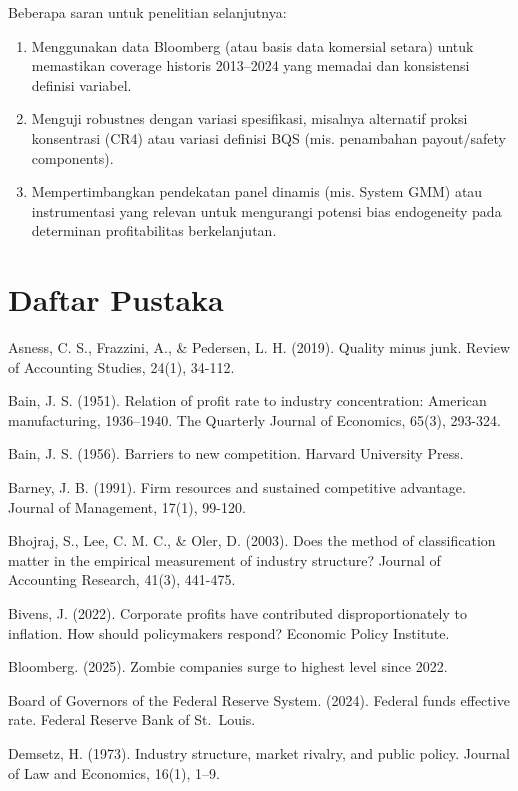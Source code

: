 \documentclass[12pt,a4paper]{report}
\providecommand{\tightlist}{%
  \setlength{\itemsep}{0pt}\setlength{\parskip}{0pt}%
}
\begin{document}
Beberapa saran untuk penelitian selanjutnya:

\begin{enumerate}
\def\labelenumi{\arabic{enumi}.}
\tightlist
\item
  Menggunakan data Bloomberg (atau basis data komersial setara) untuk
  memastikan coverage historis 2013--2024 yang memadai dan konsistensi
  definisi variabel.
\item
  Menguji robustnes dengan variasi spesifikasi, misalnya alternatif
  proksi konsentrasi (CR4) atau variasi definisi BQS (mis. penambahan
  payout/safety components).
\item
  Mempertimbangkan pendekatan panel dinamis (mis. System GMM) atau
  instrumentasi yang relevan untuk mengurangi potensi bias endogeneity
  pada determinan profitabilitas berkelanjutan.
\end{enumerate}

\hypertarget{daftar-pustaka}{%
\chapter*{Daftar Pustaka}\label{daftar-pustaka}}

Asness, C. S., Frazzini, A., \& Pedersen, L. H. (2019). Quality minus
junk. Review of Accounting Studies, 24(1), 34-112.

Bain, J. S. (1951). Relation of profit rate to industry concentration:
American manufacturing, 1936--1940. The Quarterly Journal of Economics,
65(3), 293-324.

Bain, J. S. (1956). Barriers to new competition. Harvard University
Press.

Barney, J. B. (1991). Firm resources and sustained competitive
advantage. Journal of Management, 17(1), 99-120.

Bhojraj, S., Lee, C. M. C., \& Oler, D. (2003). Does the method of
classification matter in the empirical measurement of industry
structure? Journal of Accounting Research, 41(3), 441-475.

Bivens, J. (2022). Corporate profits have contributed disproportionately
to inflation. How should policymakers respond? Economic Policy
Institute.

Bloomberg. (2025). Zombie companies surge to highest level since 2022.

Board of Governors of the Federal Reserve System. (2024). Federal funds
effective rate. Federal Reserve Bank of St.~Louis.

Demsetz, H. (1973). Industry structure, market rivalry, and public
policy. Journal of Law and Economics, 16(1), 1--9.
\end{document}

